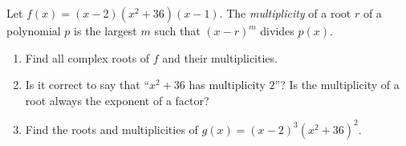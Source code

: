 Let $f(x)=(x-2)(x^2+36)(x-1)$. The \emph{multiplicity} of a root $r$ of a polynomial $p$ is the largest $m$ such that $(x-r)^m$ divides $p(x)$.
\begin{enumerate}
\item[(a)] Find all complex roots of $f$ and their multiplicities.
\item[(b)] Is it correct to say that ``$x^2+36$ has multiplicity $2$''? Is the multiplicity of a root always the exponent of a factor?
\item[(c)] Find the roots and multiplicities of $g(x)=(x-2)^3(x^2+36)^2$.
\end{enumerate}
